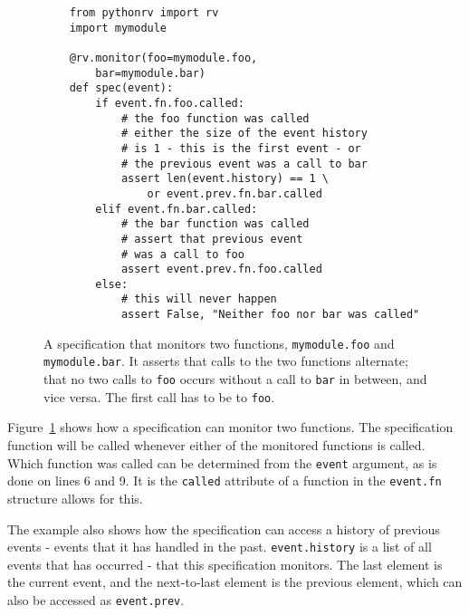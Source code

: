 \documentclass[a4paper,11pt]{kth-mag}
\begin{document}
\begin{figure}[h!]

	\begin{center}
	\begin{minipage}{0.7\textwidth}
	\begin{lstlisting}
	from pythonrv import rv
	import mymodule

	@rv.monitor(foo=mymodule.foo,
		bar=mymodule.bar)
	def spec(event):
		if event.fn.foo.called:
			# the foo function was called
			# either the size of the event history
			# is 1 - this is the first event - or
			# the previous event was a call to bar
			assert len(event.history) == 1 \
				or event.prev.fn.bar.called
		elif event.fn.bar.called:
			# the bar function was called
			# assert that previous event
			# was a call to foo
			assert event.prev.fn.foo.called
		else:
			# this will never happen
			assert False, "Neither foo nor bar was called"
	\end{lstlisting}
	\end{minipage}
	\end{center}

	\caption{A specification that monitors two functions, \texttt{mymodule.foo}
	and \texttt{mymodule.bar}. It asserts that calls to the two functions
alternate; that no two calls to \texttt{foo} occurs without a call to
\texttt{bar} in between, and vice versa. The first call has to be to
\texttt{foo}.}
	\label{figure-syntax-example-2}
\end{figure}

Figure~\ref{figure-syntax-example-2} shows how a specification can monitor two
functions. The specification function will be called whenever either of the
monitored functions is called. Which function was called can be determined from
the \texttt{event} argument, as is done on lines 6 and 9. It is the
\texttt{called} attribute of a function in the \texttt{event.fn} structure
allows for this.

The example also shows how the specification can access a history of previous
events - events that it has handled in the past. \texttt{event.history} is a
list of all events that has occurred - that this specification monitors. The
last element is the current event, and the next-to-last element is the previous
element, which can also be accessed as \texttt{event.prev}.
\end{document}
